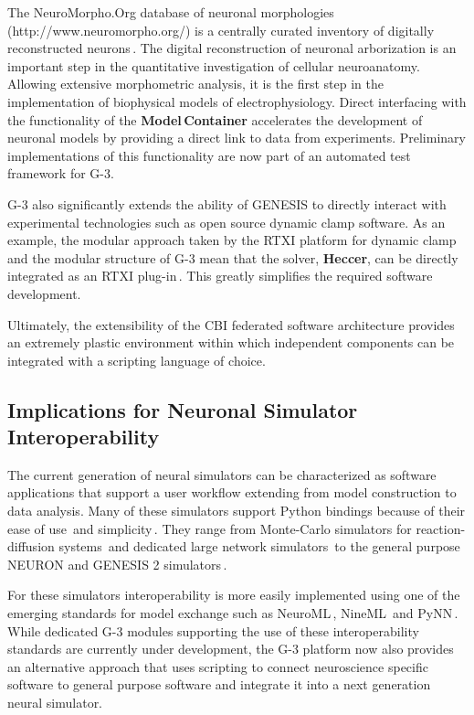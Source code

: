 \documentclass[12pt]{article}
\begin{document}
The NeuroMorpho.Org database of neuronal morphologies
(http://www.neuromorpho.org/) is a centrally curated inventory of
digitally reconstructed neurons\,\cite{ascoli06:_mobil}.  The digital
reconstruction of neuronal arborization is an important step in the
quantitative investigation of cellular neuroanatomy.  Allowing
extensive morphometric analysis, it is the first step in the
implementation of biophysical models of electrophysiology.  Direct
interfacing with the functionality of the {\bf Model\,Container}
accelerates the development of neuronal models by providing a direct
link to data from experiments.  Preliminary implementations of this
functionality are now part of an automated test framework for G-3.

G-3 also significantly extends the ability of GENESIS to directly
interact with experimental technologies such as open source dynamic
clamp software.  As an example, the modular approach taken by the RTXI
platform for dynamic
clamp\,\cite{bettencourt08:_effec_imper_dynam_clamp, dorval01:_real}
and the modular structure of G-3 mean that the solver, {\bf Heccer},
can be directly integrated as an RTXI
plug-in\,\cite{cornelis10:_realt_rtxi_genes}.  This greatly simplifies
the required software development.

Ultimately, the extensibility of the CBI federated software
architecture provides an extremely plastic environment within which
independent components can be integrated with a scripting language of
choice.



\subsection{Implications for Neuronal Simulator Interoperability}

The current generation of neural simulators can be characterized as
software applications that support a user workflow extending from
model construction to data analysis.  Many of these simulators support
Python bindings because of their ease of use\,\cite{pecevski09:_pcsim}
and simplicity\,\cite{goodman08:_brian}.  They range from Monte-Carlo
simulators for reaction-diffusion systems\,\cite{wils09:_steps} and
dedicated large network simulators\,\cite{eppler08:_pynes} to the
general purpose NEURON and GENESIS 2
simulators\,\cite{hines09:_neuron_python, bower98:_book_genes}.

For these simulators interoperability is more easily implemented using
one of the emerging standards for model exchange such as
NeuroML\,\cite{nigel01:_towar_neurom},
NineML\,\cite{gortechnikov10:_ninem_user_layer} and
PyNN\,\cite{andrew08:_pynn}.  While dedicated G-3 modules supporting
the use of these interoperability standards are currently under
development, the G-3 platform now also provides an alternative
approach that uses scripting to connect neuroscience specific software
to general purpose software and integrate it into a next generation
neural simulator.
\end{document}
